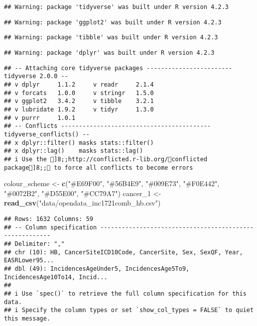 \documentclass[
]{article}
\newenvironment{Shaded}{\begin{snugshade}}{\end{snugshade}}
\newcommand{\FunctionTok}[1]{\textcolor[rgb]{0.13,0.29,0.53}{\textbf{#1}}}
\newcommand{\NormalTok}[1]{#1}
\newcommand{\OtherTok}[1]{\textcolor[rgb]{0.56,0.35,0.01}{#1}}
\newcommand{\StringTok}[1]{\textcolor[rgb]{0.31,0.60,0.02}{#1}}
\begin{document}
\begin{verbatim}
## Warning: package 'tidyverse' was built under R version 4.2.3
\end{verbatim}

\begin{verbatim}
## Warning: package 'ggplot2' was built under R version 4.2.3
\end{verbatim}

\begin{verbatim}
## Warning: package 'tibble' was built under R version 4.2.3
\end{verbatim}

\begin{verbatim}
## Warning: package 'dplyr' was built under R version 4.2.3
\end{verbatim}

\begin{verbatim}
## -- Attaching core tidyverse packages ------------------------ tidyverse 2.0.0 --
## v dplyr     1.1.2     v readr     2.1.4
## v forcats   1.0.0     v stringr   1.5.0
## v ggplot2   3.4.2     v tibble    3.2.1
## v lubridate 1.9.2     v tidyr     1.3.0
## v purrr     1.0.1     
## -- Conflicts ------------------------------------------ tidyverse_conflicts() --
## x dplyr::filter() masks stats::filter()
## x dplyr::lag()    masks stats::lag()
## i Use the ]8;;http://conflicted.r-lib.org/conflicted package]8;; to force all conflicts to become errors
\end{verbatim}

\begin{Shaded}
\begin{Highlighting}[]
\NormalTok{colour\_scheme }\OtherTok{\textless{}{-}}  \FunctionTok{c}\NormalTok{(}\StringTok{"\#E69F00"}\NormalTok{, }\StringTok{"\#56B4E9"}\NormalTok{, }\StringTok{"\#009E73"}\NormalTok{, }\StringTok{"\#F0E442"}\NormalTok{, }\StringTok{"\#0072B2"}\NormalTok{, }\StringTok{"\#D55E00"}\NormalTok{, }\StringTok{"\#CC79A7"}\NormalTok{)}
\NormalTok{cancer\_1 }\OtherTok{\textless{}{-}} \FunctionTok{read\_csv}\NormalTok{(}\StringTok{"data/opendata\_inc1721comb\_hb.csv"}\NormalTok{)}
\end{Highlighting}
\end{Shaded}

\begin{verbatim}
## Rows: 1632 Columns: 59
## -- Column specification --------------------------------------------------------
## Delimiter: ","
## chr (10): HB, CancerSiteICD10Code, CancerSite, Sex, SexQF, Year, EASRLower95...
## dbl (49): IncidencesAgeUnder5, IncidencesAge5To9, IncidencesAge10To14, Incid...
## 
## i Use `spec()` to retrieve the full column specification for this data.
## i Specify the column types or set `show_col_types = FALSE` to quiet this message.
\end{verbatim}
\end{document}
